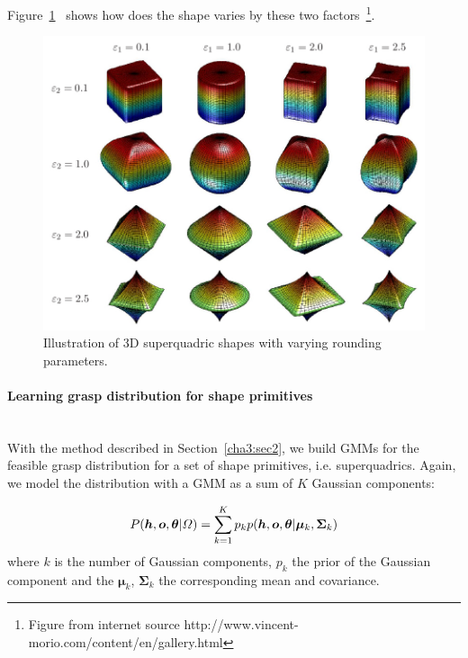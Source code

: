 Figure~\ref{fig:sq}~ shows how does the shape varies by these two factors~\footnote{Figure from internet source http://www.vincent-morio.com/content/en/gallery.html}.

\begin{figure}
  \centering
  \includegraphics[width=14cm]{./fig_cha3/superquadrics.jpg}
  \caption{Illustration of 3D superquadric shapes with varying rounding parameters\protect\footnotemark.}
  \label{fig:sq}
\end{figure}


\paragraph{Learning grasp distribution for shape primitives}
~\\

With the method described in Section~\ref{cha3:sec2}, we build GMMs for the feasible grasp distribution for a set of shape primitives, i.e. superquadrics. Again, we model the distribution with a GMM as a sum of $K$ Gaussian components:

\begin{equation}
{
P (\boldsymbol{h},\boldsymbol{o},\boldsymbol\theta \text{\textbar} \varOmega)
= \sum_{k=1}^K {p_{k}p(\boldsymbol{h},\boldsymbol{o},\boldsymbol{\theta} \text{\textbar} {\boldsymbol{\mu}_k}, {\boldsymbol{\Sigma}_k})}
}
\end{equation}
where $k$ is the number of Gaussian components, $p_k$ the prior of the Gaussian component and the $\boldsymbol{\mu}_k$, $\boldsymbol{\Sigma}_k$ the corresponding mean and covariance.

